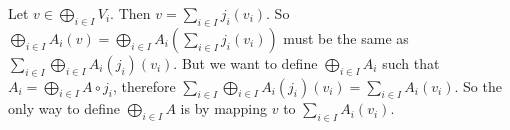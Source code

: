 
Let $v \in \bigoplus_{i\in I}V_i$. Then $v= \sum_{i\in I} j_i(v_i)$. So $\bigoplus_{i \in I} A_i (v) = \bigoplus_{i \in I} A_i ( \sum_{i\in I} j_i(v_i))$ must be the same as $\sum_{i\in I} \bigoplus_{i \in I} A_i (j_i)(v_i)$. But we want to define $ \bigoplus_{i \in I} A_i$ such that $A_i = \bigoplus_{i \in I} A  \circ j_i$, therefore $\sum_{i\in I} \bigoplus_{i \in I} A_i (j_i)(v_i)= \sum_{i\in I} A_i(v_i)$. So the only way to define $ \bigoplus_{i \in I} A$ is by mapping $v$ to $\sum_{i\in I} A_i(v_i)$.